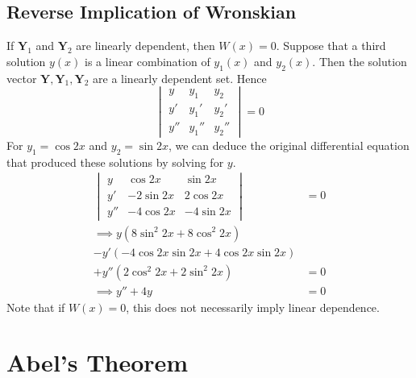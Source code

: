 \documentclass{article}
\begin{document}
	\subsection{Reverse Implication of Wronskian}
	If $\bm Y_1$ and $\bm Y_2$ are linearly dependent, then $W(x) = 0$. Suppose that a third solution $y(x)$ is a linear combination of $y_1(x)$ and $y_2(x)$. Then the solution vector $\bm Y, \bm Y_1, \bm Y_2$ are a linearly dependent set. Hence
	\[
		\begin{vmatrix}
			y & y_1 & y_2 \\
			y' & y_1' & y_2' \\
			y'' & y_1'' & y_2''
		\end{vmatrix}
		= 0
	\]
	For $y_1 = \cos 2x$ and $y_2 = \sin 2x$, we can deduce the original differential equation that produced these solutions by solving for $y$.
	\begin{align*}
		\begin{vmatrix}
			y & \cos 2x & \sin 2x \\
			y' & -2\sin 2x & 2 \cos 2x \\
			y'' & -4\cos 2x & -4 \sin 2x
		\end{vmatrix} &= 0 \\
		\implies y(8\sin^2 2x + 8\cos^2 2x) &\\ - y'(-4 \cos 2x \sin 2x + 4 \cos 2x \sin 2x) &\\ + y''(2\cos^2 2x + 2\sin^2 2x) &= 0 \\
		\implies y'' + 4y &= 0
	\end{align*}
	Note that if $W(x) = 0$, this does not necessarily imply linear dependence.

	\section{Abel's Theorem}
\end{document}
